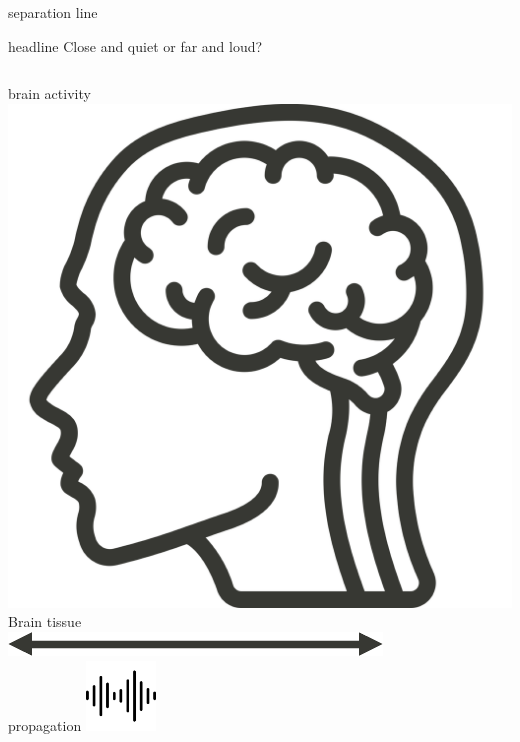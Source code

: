 \documentclass{beamer}
\begin{document}
\begin{frame}
        \begin{beamercolorbox}[wd=\textwidth, center, sep=.3ex]{separation line}
            \begin{beamercolorbox}[wd=.99\textwidth, center, sep=1ex]{headline}
                Close and quiet or far and loud?
            \end{beamercolorbox}
        \end{beamercolorbox}

        \begin{columns}
                \centering
                brain activity
                \includegraphics[width=.5\textwidth]{brain}\\
                \centering
                Brain tissue\\
                \includegraphics[width=\textwidth]{arrow}\\
                propagation
                \centering
                \includegraphics[height=5em]{MEG_signals}

\end{columns}
\end{frame}
\end{document}
